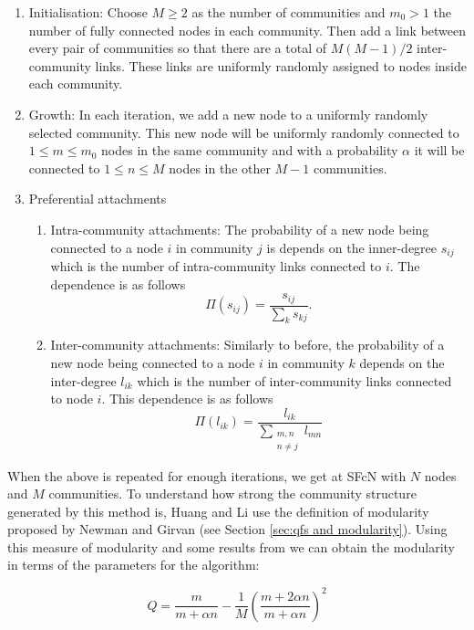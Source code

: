 \begin{enumerate}
    \item Initialisation: Choose $M \geq 2$ as the number of communities and $m_0 > 1$ the number of fully connected nodes in each community. Then add a link between every pair of communities so that there are a total of $M(M-1)/2$ inter-community links. These links are uniformly randomly assigned to nodes inside each community. \\
    \item Growth: In each iteration, we add a new node to a uniformly randomly selected community. This new node will be uniformly randomly connected to $1 \leq m \leq m_0$ nodes in the same community and with a probability $\alpha$ it will be connected to $1 \leq n \leq M$ nodes in the other $M - 1$ communities. \\
    \item Preferential attachments
    \begin{enumerate}
        \item Intra-community attachments: The probability of a new node being connected to a node $i$ in community $j$ is depends on the inner-degree $s_{ij}$ which is the number of intra-community links connected to $i$. The dependence is as follows
            $$ \Pi(s_{ij}) = \frac{s_{ij}}{\sum_ks_{kj}}. $$
        \item Inter-community attachments: Similarly to before, the probability of a new node being connected to a node $i$ in community $k$ depends on the inter-degree $l_{ik}$ which is the number of inter-community links connected to node $i$. This dependence is as follows
            $$ \Pi(l_{ik}) = \frac{l_{ik}}{\sum_{\substack{m, n \\ n \not = j}} l_{mn}} $$
    \end{enumerate}
\end{enumerate}

When the above is repeated for enough iterations, we get at SFcN with $N$ nodes and $M$ communities. To understand how strong the community structure generated by this method is, Huang and Li use the definition of modularity proposed by Newman and Girvan (see Section \ref{sec:qfs and modularity}). Using this measure of modularity and some results from \cite{Li_2005} we can obtain the modularity in terms of the parameters for the algorithm:

$$ Q = \frac{m}{m + \alpha n} - \frac{1}{M}\left(\frac{m + 2\alpha n}{m + \alpha n}\right)^2 $$

